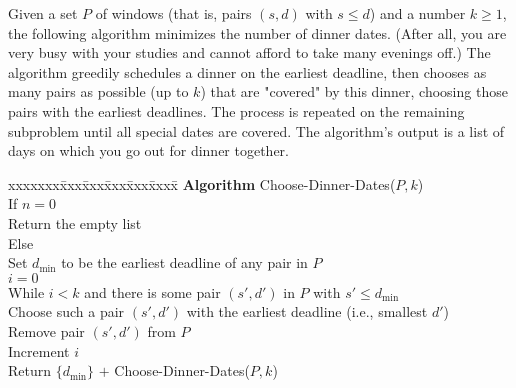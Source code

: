 \documentclass[11pt]{article}
\begin{document}
Given a set $P$ of windows (that is, pairs $(s,d)$ with $s \le d$)
and a number $k \ge 1$, the following algorithm 
minimizes the number of dinner dates.
(After all, you are very busy with your studies and cannot
afford to take many evenings off.)
The algorithm greedily schedules a dinner on the earliest deadline,
then chooses as many pairs as possible (up to $k$) that are "covered"
by this dinner, choosing those pairs with the earliest deadlines.  The
process is repeated on the remaining subproblem until all special
dates are covered. The algorithm's output is
a list of days on which you go out for dinner together.

\begin{tabbing}
xxxxxxx\=xxx\=xxx\=xxx\=xxx\=xxxx\= \kill
\> {\bf Algorithm} Choose-Dinner-Dates($P, k$) \\
\>\>   If $n = 0$ \\
\>\>\>   Return the empty list \\
\>\>   Else \\
\>\>\>   Set $d_{\min}$ to be the earliest deadline of any pair in $P$ \\
\>\>\>   $i=0$ \\
\>\>\>   While $i<k$ and there is some pair $(s',d')$ in $P$ with $s' \le d_{\min}$ \\
\>\>\>\>    Choose such a pair $(s',d')$ with the earliest deadline (i.e., smallest $d'$) \\
\>\>\>\>    Remove pair $(s',d')$ from $P$ \\
\>\>\>\>    Increment $i$ \\
\>\>\>   Return $\{d_{\min}\}$ $+$ Choose-Dinner-Dates($P,k$) 
\end{tabbing}
\end{document}
